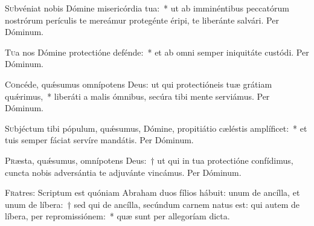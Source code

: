 \documentclass[vesperale_romanum.tex]{subfiles}
\begin{document}

\oratio

\lettrine{S}{u}bvéniat nobis Dómine misericórdia tua:~* ut ab imminéntibus peccatórum nostrórum perículis te mereámur protegénte éripi, te liberánte salvári.
Per Dóminum.


\oratio

\lettrine{T}{u}a nos Dómine protectióne defénde:~* et ab omni semper iniquitáte custódi. Per Dóminum.



\oratio

\lettrine{C}{o}ncéde, quǽsumus omnípotens Deus: ut qui protectióneis tuæ grátiam quǽrimus,~* liberáti a malis ómnibus, secúra tibi mente serviámus. Per Dóminum.



\oratio

\lettrine{S}{u}bjéctum tibi pópulum, quǽsumus, Dómine, propitiátio cæléstis amplíficet:~* et tuis semper fáciat servíre mandátis. Per Dóminum.



\oratio

\lettrine{P}{r}æsta, quǽsumus, omnípotens Deus:~† ut qui in tua protectióne confídimus, cuncta nobis adversántia te adjuvánte vincámus. Per Dóminum.
\newpage
{}


\lettrine{F}{r}atres: Scriptum est quóniam Abraham duos fílios hábuit: unum de ancílla, et unum de líbera:~† sed qui de ancílla, secúndum carnem natus est: qui autem de líbera, per repromissiónem:~* quæ sunt per allegoríam dicta.


\end{document}
